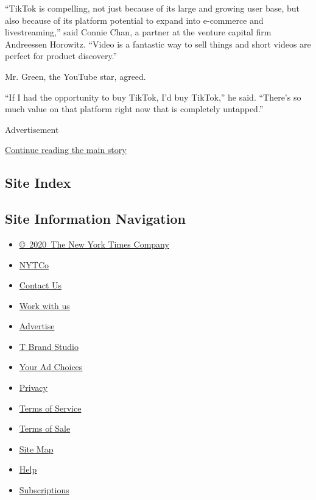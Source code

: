 ``TikTok is compelling, not just because of its large and growing user
base, but also because of its platform potential to expand into
e-commerce and livestreaming,'' said Connie Chan, a partner at the
venture capital firm Andreessen Horowitz. ``Video is a fantastic way to
sell things and short videos are perfect for product discovery.''

Mr. Green, the YouTube star, agreed.

``If I had the opportunity to buy TikTok, I'd buy TikTok,'' he said.
``There's so much value on that platform right now that is completely
untapped.''

Advertisement

\protect\hyperlink{after-bottom}{Continue reading the main story}

\hypertarget{site-index}{%
\subsection{Site Index}\label{site-index}}

\hypertarget{site-information-navigation}{%
\subsection{Site Information
Navigation}\label{site-information-navigation}}

\begin{itemize}
\tightlist
\item
  \href{https://help.nytimes3xbfgragh.onion/hc/en-us/articles/115014792127-Copyright-notice}{©~2020~The
  New York Times Company}
\end{itemize}

\begin{itemize}
\tightlist
\item
  \href{https://www.nytco.com/}{NYTCo}
\item
  \href{https://help.nytimes3xbfgragh.onion/hc/en-us/articles/115015385887-Contact-Us}{Contact
  Us}
\item
  \href{https://www.nytco.com/careers/}{Work with us}
\item
  \href{https://nytmediakit.com/}{Advertise}
\item
  \href{http://www.tbrandstudio.com/}{T Brand Studio}
\item
  \href{https://www.nytimes3xbfgragh.onion/privacy/cookie-policy\#how-do-i-manage-trackers}{Your
  Ad Choices}
\item
  \href{https://www.nytimes3xbfgragh.onion/privacy}{Privacy}
\item
  \href{https://help.nytimes3xbfgragh.onion/hc/en-us/articles/115014893428-Terms-of-service}{Terms
  of Service}
\item
  \href{https://help.nytimes3xbfgragh.onion/hc/en-us/articles/115014893968-Terms-of-sale}{Terms
  of Sale}
\item
  \href{https://spiderbites.nytimes3xbfgragh.onion}{Site Map}
\item
  \href{https://help.nytimes3xbfgragh.onion/hc/en-us}{Help}
\item
  \href{https://www.nytimes3xbfgragh.onion/subscription?campaignId=37WXW}{Subscriptions}
\end{itemize}
